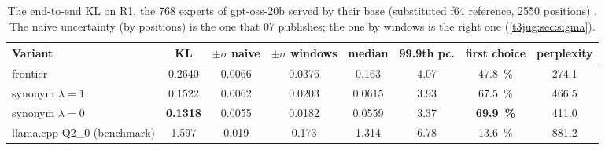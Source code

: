 \begin{table}[ht]
\centering\footnotesize
\caption[The end-to-end KL, 768 experts substituted]{The end-to-end KL on R1, the 768 experts of gpt-oss-20b served by their base (substituted f64 reference, \num{2550} positions) \mes. The naive uncertainty (by positions) is the one that 07 publishes; the one by windows is the right one (\cref{t3jug:sec:sigma}).}
\label{t3sno:tab:kl}
\begin{tabular}{@{}lccccccc@{}}
\toprule
Variant & KL & $\pm\sigma$ naive & $\pm\sigma$ windows & median & 99.9th pc. & first choice & perplexity \\
\midrule
frontier & \num{0.2640} & \num{0.0066} & \num{0.0376} & \num{0.163} & \num{4.07} & \SI{47.8}{\percent} & \num{274.1} \\
synonym $\lambda = 1$ & \num{0.1522} & \num{0.0062} & \num{0.0203} & \num{0.0615} & \num{3.93} & \SI{67.5}{\percent} & \num{466.5} \\
synonym $\lambda = 0$ & \textbf{\num{0.1318}} & \num{0.0055} & \num{0.0182} & \num{0.0559} & \num{3.37} & \textbf{\SI{69.9}{\percent}} & \num{411.0} \\
\midrule
llama.cpp Q2\_0 (benchmark) & \num{1.597} & \num{0.019} & \num{0.173} & \num{1.314} & \num{6.78} & \SI{13.6}{\percent} & \num{881.2} \\
\bottomrule
\end{tabular}
\end{table}

